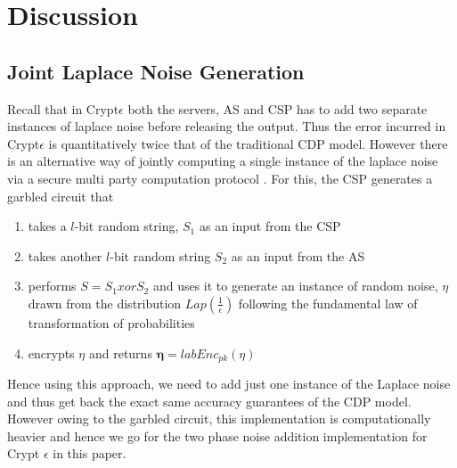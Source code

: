 \section{Discussion}
\subsection{Joint Laplace Noise Generation}\label{jointLap}
Recall that in Crypt$\epsilon$ both the servers, \textsf{AS} and \textsf{CSP} has to add two separate instances of laplace noise before releasing the output. Thus the error incurred in Crypt$\epsilon$ is quantitatively twice that of the traditional \textsf{CDP} model. However there is an alternative way of jointly computing a single instance of the laplace noise via a secure multi party computation protocol \cite{Djoin}. For this, the CSP generates a garbled circuit that \begin{enumerate}\item takes a $l$-bit random string, $S_1$ as an input from the \textsf{CSP}
    \item takes another $l$-bit random string $S_2$ as an input from the \textsf{AS} \item performs $S=S_1 xor S_2$  and uses it to generate an instance of random noise, $\eta$ drawn from the distribution $Lap(\frac{1}{\epsilon})$ following the fundamental law of transformation of probabilities \item encrypts $\eta$ and returns $\boldsymbol{\eta}=labEnc_{pk}(\eta)$\end{enumerate}
Hence using this approach, we need to add just one instance of the Laplace noise and thus get back the exact same accuracy guarantees of the \textsf{CDP} model. However owing to the garbled circuit, this implementation is computationally heavier and hence we go for the two phase noise addition implementation for Crypt $\epsilon$ in this paper.

